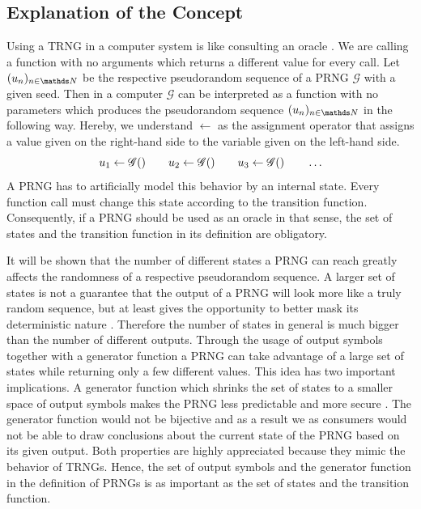 \documentclass{stdlocal}
\begin{document}
  \subsection{Explanation of the Concept}
  Using a TRNG in a computer system is like consulting an oracle \autocite{mueller2012}.
  We are calling a function with no arguments which returns a different value for every call.
  Let $(u_n)_{n\in\setNatural}$ be the respective pseudorandom sequence of a PRNG $\mathscr{G}$ with a given seed.
  Then in a computer $\mathscr{G}$ can be interpreted as a function with no parameters which produces the pseudorandom sequence $(u_n)_{n\in\setNatural}$ in the following way.
  Hereby, we understand $\leftarrow$ as the assignment operator that assigns a value given on the right-hand side to the variable given on the left-hand side.
  \[
    u_1 \leftarrow \mathscr{G}()
    \qquad
    u_2 \leftarrow \mathscr{G}()
    \qquad
    u_3 \leftarrow \mathscr{G}()
    \qquad
    \ldots
  \]
  A PRNG has to artificially model this behavior by an internal state.
  Every function call must change this state according to the transition function.
  Consequently, if a PRNG should be used as an oracle in that sense, the set of states and the transition function in its definition are obligatory.

  It will be shown that the number of different states a PRNG can reach greatly affects the randomness of a respective pseudorandom sequence.
  A larger set of states is not a guarantee that the output of a PRNG will look more like a truly random sequence, but at least gives the opportunity to better mask its deterministic nature \autocite{oneill2014}.
  Therefore the number of states in general is much bigger than the number of different outputs.
  Through the usage of output symbols together with a generator function a PRNG can take advantage of a large set of states while returning only a few different values.
  This idea has two important implications.
  A generator function which shrinks the set of states to a smaller space of output symbols makes the PRNG less predictable and more secure \autocite{oneill2014}.
  The generator function would not be bijective and as a result we as consumers would not be able to draw conclusions about the current state of the PRNG based on its given output.
  Both properties are highly appreciated because they mimic the behavior of TRNGs.
  Hence, the set of output symbols and the generator function in the definition of PRNGs is as important as the set of states and the transition function.
\end{document}

